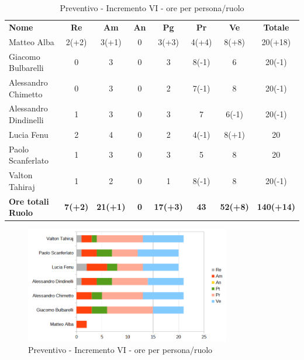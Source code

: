 \begin{table} [h!]
	\begin{center}
		\begin{tabular} { m{3.5cm} c c c c c c c }
			\rowcolor{lightgray}
			\textbf{Nome} & \textbf{Re} & \textbf{Am} & \textbf{An} & \textbf{Pg} & \textbf{Pr} & \textbf{Ve} & \textbf{Totale} \\
			Matteo Alba & 2(+2) & 3(+1) & 0 & 3(+3) & 4(+4) & 8(+8) & 20(+18) \\
		Giacomo Bulbarelli & 0 & 3 & 0 & 3 & 8(-1) & 6 & 20(-1) \\
		Alessandro Chimetto & 0 & 3 & 0 & 2 & 7(-1) & 8 & 20(-1) \\
		Alessandro Dindinelli & 1 & 3 & 0 & 3 & 7 & 6(-1) & 20(-1) \\
		Lucia Fenu & 2 & 4 & 0 & 2 & 4(-1) & 8(+1) & 20 \\
		Paolo Scanferlato & 1 & 3 & 0 & 3 & 5 & 8 & 20 \\
		Valton Tahiraj & 1 & 2 & 0 & 1 & 8(-1) & 8 & 20(-1) \\
		\textbf{Ore totali Ruolo} & \textbf{7(+2)} & \textbf{21(+1)} & \textbf{0} & \textbf{17(+3)} & \textbf{43}& \textbf{52(+8)} & \textbf{140(+14)}
		\end{tabular}
		\caption{Preventivo - Incremento VI - ore per persona/ruolo}
	\end{center}
\end{table}
\begin{figure} [h!]
	\centering
	\includegraphics[width=0.8\textwidth]{res/img/grafici/consuntivo-barre- incremento6.png}
	\caption{Preventivo - Incremento VI - ore per persona/ruolo} 
\end{figure}

\newpage
